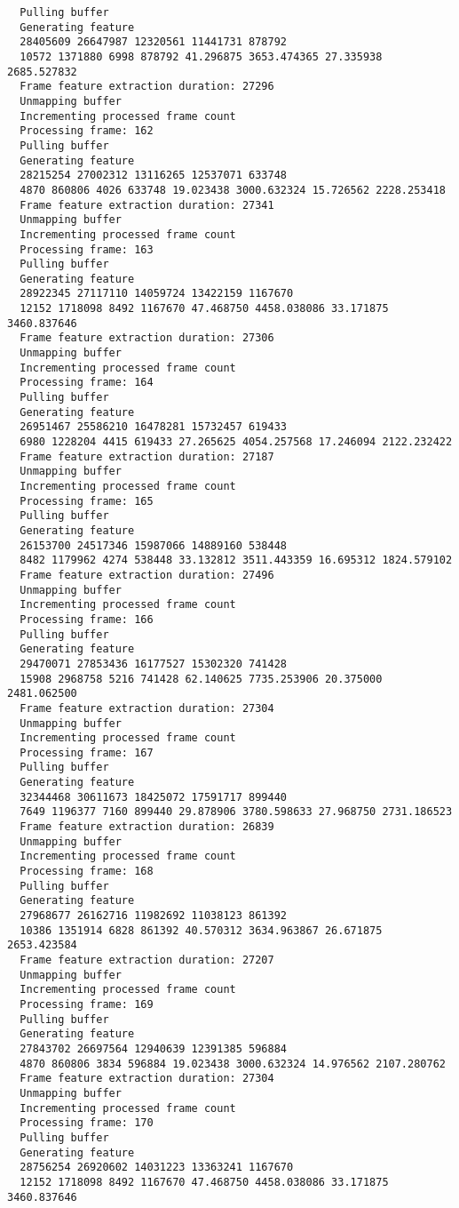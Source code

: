 \documentclass[12pt,oneside]{book}
\begin{document}
\begin{lstlisting}
  Pulling buffer
  Generating feature
  28405609 26647987 12320561 11441731 878792
  10572 1371880 6998 878792 41.296875 3653.474365 27.335938 2685.527832
  Frame feature extraction duration: 27296
  Unmapping buffer
  Incrementing processed frame count
  Processing frame: 162
  Pulling buffer
  Generating feature
  28215254 27002312 13116265 12537071 633748
  4870 860806 4026 633748 19.023438 3000.632324 15.726562 2228.253418
  Frame feature extraction duration: 27341
  Unmapping buffer
  Incrementing processed frame count
  Processing frame: 163
  Pulling buffer
  Generating feature
  28922345 27117110 14059724 13422159 1167670
  12152 1718098 8492 1167670 47.468750 4458.038086 33.171875 3460.837646
  Frame feature extraction duration: 27306
  Unmapping buffer
  Incrementing processed frame count
  Processing frame: 164
  Pulling buffer
  Generating feature
  26951467 25586210 16478281 15732457 619433
  6980 1228204 4415 619433 27.265625 4054.257568 17.246094 2122.232422
  Frame feature extraction duration: 27187
  Unmapping buffer
  Incrementing processed frame count
  Processing frame: 165
  Pulling buffer
  Generating feature
  26153700 24517346 15987066 14889160 538448
  8482 1179962 4274 538448 33.132812 3511.443359 16.695312 1824.579102
  Frame feature extraction duration: 27496
  Unmapping buffer
  Incrementing processed frame count
  Processing frame: 166
  Pulling buffer
  Generating feature
  29470071 27853436 16177527 15302320 741428
  15908 2968758 5216 741428 62.140625 7735.253906 20.375000 2481.062500
  Frame feature extraction duration: 27304
  Unmapping buffer
  Incrementing processed frame count
  Processing frame: 167
  Pulling buffer
  Generating feature
  32344468 30611673 18425072 17591717 899440
  7649 1196377 7160 899440 29.878906 3780.598633 27.968750 2731.186523
  Frame feature extraction duration: 26839
  Unmapping buffer
  Incrementing processed frame count
  Processing frame: 168
  Pulling buffer
  Generating feature
  27968677 26162716 11982692 11038123 861392
  10386 1351914 6828 861392 40.570312 3634.963867 26.671875 2653.423584
  Frame feature extraction duration: 27207
  Unmapping buffer
  Incrementing processed frame count
  Processing frame: 169
  Pulling buffer
  Generating feature
  27843702 26697564 12940639 12391385 596884
  4870 860806 3834 596884 19.023438 3000.632324 14.976562 2107.280762
  Frame feature extraction duration: 27304
  Unmapping buffer
  Incrementing processed frame count
  Processing frame: 170
  Pulling buffer
  Generating feature
  28756254 26920602 14031223 13363241 1167670
  12152 1718098 8492 1167670 47.468750 4458.038086 33.171875 3460.837646

\end{lstlisting}
\end{document}
